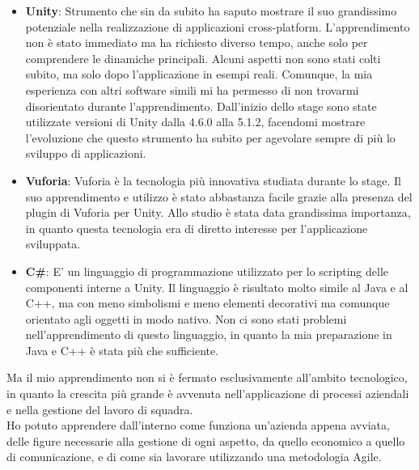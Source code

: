 \begin{itemize}
	\item \textbf{Unity}: Strumento che sin da subito ha saputo mostrare il suo grandissimo potenziale nella realizzazione di applicazioni cross-platform. L'apprendimento non \`e stato immediato ma ha richiesto diverso tempo, anche solo per comprendere le dinamiche principali. Alcuni aspetti non sono stati colti subito, ma solo dopo l'applicazione in esempi reali. Comunque, la mia esperienza con altri software simili mi ha permesso di non trovarmi disorientato durante l'apprendimento. Dall'inizio dello stage sono state utilizzate versioni di Unity dalla 4.6.0 alla 5.1.2, facendomi mostrare l'evoluzione che questo strumento ha subito per agevolare sempre di pi\`u lo sviluppo di applicazioni.
	\item \textbf{Vuforia}: Vuforia \`e la tecnologia pi\`u innovativa studiata durante lo stage. Il suo apprendimento e utilizzo \`e stato abbastanza facile grazie alla presenza del plugin di Vuforia per Unity. Allo studio \`e stata data grandissima importanza, in quanto questa tecnologia era di diretto interesse per l'applicazione sviluppata.
	\item \textbf{C\#}: E' un linguaggio di programmazione utilizzato per lo scripting delle componenti interne a Unity. Il linguaggio \`e risultato molto simile al Java e al C++, ma con meno simbolismi e meno elementi decorativi ma comunque orientato agli oggetti in modo nativo. Non ci sono stati problemi nell'apprendimento di questo linguaggio, in quanto la mia preparazione in Java e C++ \`e stata pi\`u che sufficiente.
\end{itemize}

Ma il mio apprendimento non si \`e fermato esclusivamente all'ambito tecnologico, in quanto la crescita pi\`u grande \`e avvenuta nell'applicazione di processi aziendali e nella gestione del lavoro di squadra.\\
Ho potuto apprendere dall'interno come funziona un'azienda appena avviata, delle figure necessarie alla gestione di ogni aspetto, da quello economico a quello di comunicazione, e di come sia lavorare utilizzando una metodologia Agile.

